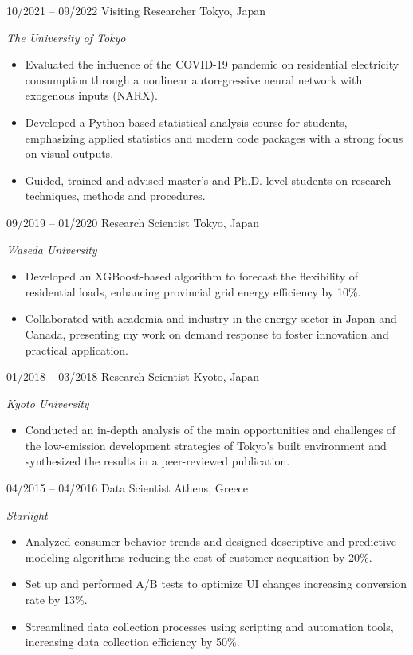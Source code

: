 \begin{entrylist}
\entry
{10/2021 -- 09/2022}
{Visiting Researcher}
{Tokyo, Japan}
{\emph{The University of Tokyo}
\begin{itemize}
	\item Evaluated the influence of the COVID-19 pandemic on residential electricity consumption through a nonlinear autoregressive neural network with exogenous inputs (NARX). %
 	\item Developed a Python-based statistical analysis course for students, emphasizing applied statistics and modern code packages with a strong focus on visual outputs. %
	\item Guided, trained and advised master's and Ph.D. level students on research techniques, methods and procedures. %
\end{itemize}
}

\entry
{09/2019 -- 01/2020}
{Research Scientist}
{Tokyo, Japan}
{\emph{Waseda University}
\begin{itemize}
\item Developed an XGBoost-based algorithm to forecast the flexibility of residential loads, enhancing provincial grid energy efficiency by 10\%. %
\item Collaborated with academia and industry in the energy sector in Japan and Canada, presenting my work on demand response to foster innovation and practical application. %
\end{itemize}
}
\end{entrylist}
\begin{entrylist}
\entry
{01/2018 -- 03/2018}
{Research Scientist}
{Kyoto, Japan}
{\emph{Kyoto University}
\begin{itemize}
\item Conducted an in-depth analysis of the main opportunities and challenges of the low-emission development strategies of Tokyo’s built environment and synthesized the results in a peer-reviewed publication. %
\end{itemize}
}
\end{entrylist}
\begin{entrylist}
\entry
{04/2015 -- 04/2016}
{Data Scientist}
{Athens, Greece}
{\emph{Starlight}
\begin{itemize}
\item	Analyzed consumer behavior trends and designed descriptive and predictive modeling algorithms reducing the cost of customer acquisition by 20\%. %
\item	Set up and performed A/B tests to optimize UI changes increasing conversion rate by 13\%. %
\item	Streamlined data collection processes using scripting and automation tools, increasing data collection efficiency by 50\%. %
\end{itemize}}
\end{entrylist}
